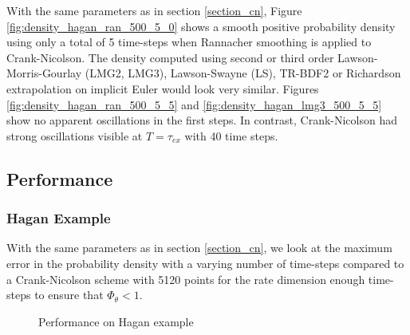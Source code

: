 \documentclass[]{rAMF2e}
\begin{document}
With the same parameters as in section \ref{section_cn}, Figure \ref{fig:density_hagan_ran_500_5_0} shows a smooth positive probability density using only a total of 5 time-steps when Rannacher smoothing is applied to Crank-Nicolson. The density computed using second or third order Lawson-Morris-Gourlay (LMG2, LMG3), Lawson-Swayne (LS), TR-BDF2 or Richardson extrapolation on implicit Euler would look very similar. Figures \ref{fig:density_hagan_ran_500_5_5} and \ref{fig:density_hagan_lmg3_500_5_5} show no apparent oscillations in the first steps.
In contrast, Crank-Nicolson had strong oscillations visible at $T=\tau_{ex}$ with 40 time steps.

\subsection{Performance}
\subsubsection{Hagan Example}
With the same parameters as in section \ref{section_cn}, we look at the maximum error in the probability density with a varying number of time-steps compared to a Crank-Nicolson scheme with 5120 points for the rate dimension enough time-steps to ensure that $\Phi_{\theta} < 1$. 

\begin{figure}[htb]
  \begin{center}  
    \end{center}
     \caption{\label{fig:perf_hagan_500} Performance on Hagan example}
\end{figure}
\end{document}
